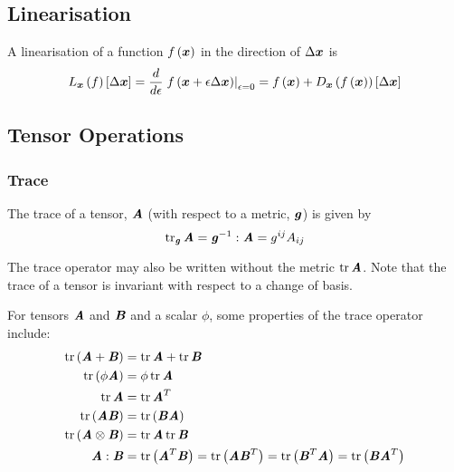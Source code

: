 \subsection{Linearisation}
\label{subsec:Linearisation}

A linearisation of a function $ f\left( \boldsymbol{x} \right) $ in the direction of
$\Delta\boldsymbol{x}$ is
\begin{equation}
  \linearisation{f}{\vectr{x}}{\vectr{x}}=\dby{}{\epsilon}\evalat{\fnof{f}{\vectr{x}+\epsilon\linearisationdir{\vectr{x}}}}{\epsilon=0}=\fnof{f}{\vectr{x}}+\directionalderiv{\vectr{x}}{\fnof{f}{\vectr{x}}}{\linearisationdir{\vectr{x}}}
\end{equation}
 
\subsection{Tensor Operations}
\label{subsec:TensorOperations}

\subsubsection{Trace}
\label{subsubsec:Trace}

The trace of a tensor, $\boldsymbol{\mathit{A}}$ (with respect to a metric, $\boldsymbol{\mathit{g}}$) is given by
\begin{equation}
  \trace{\tensor{g}}{\tensor{A}}=\doubledotprod{\inverse{\tensor{g}}}{\tensor{A}}=g^{ij}A_{ij}
\end{equation}

The trace operator may also be written without the metric \ie
$\trace{}{\tensor{A}}$. Note that the trace of a tensor is invariant with
respect to a change of basis.

For tensors $\boldsymbol{\mathit{A}}$ and $\boldsymbol{\mathit{B}}$ and a scalar $\phi$, some properties of the trace operator include:
\begin{align}
  \trace{}{\pbrac{\tensor{A}+\tensor{B}}}&=\trace{}{\tensor{A}}+\trace{}{\tensor{B}}\\
  \trace{}{\pbrac{\phi\tensor{A}}}&=\phi\trace{}{\tensor{A}} \\
  \trace{}{\tensor{A}}&=\trace{}{\transpose{\tensor{A}}} \\
  \trace{}{\pbrac{\tensor{A}\tensor{B}}}&=\trace{}{\pbrac{\tensor{B}\tensor{A}}}\\
  \trace{}{\pbrac{\tensorprod{\tensor{A}}{\tensor{B}}}}&=\trace{}{\tensor{A}}\trace{}{\tensor{B}}\\
  \doubledotprod{\tensor{A}}{\tensor{B}}&=\trace{}{\pbrac{\transpose{\tensor{A}}\tensor{B}}}=\trace{}{\pbrac{\tensor{A}\transpose{\tensor{B}}}}=\trace{}{\pbrac{\transpose{\tensor{B}}\tensor{A}}}=\trace{}{\pbrac{\tensor{B}\transpose{\tensor{A}}}}
\end{align}

